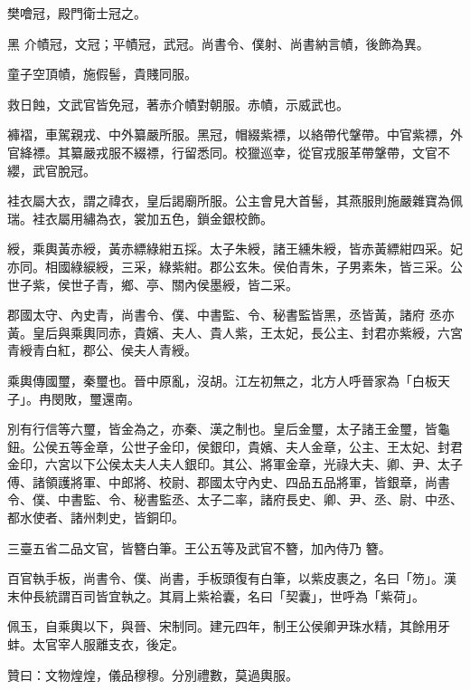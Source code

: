\begin{pinyinscope}
 樊噲冠，殿門衛士冠之。



 黑
 介幘冠，文冠；平幘冠，武冠。尚書令、僕射、尚書納言幘，後飾為異。



 童子空頂幘，施假髻，貴賤同服。



 救日蝕，文武官皆免冠，著赤介幘對朝服。赤幘，示威武也。



 褲褶，車駕親戎、中外纂嚴所服。黑冠，帽綴紫褾，以絡帶代鞶帶。中官紫褾，外官絳褾。其纂嚴戎服不綴褾，行留悉同。校獵巡幸，從官戎服革帶鞶帶，文官不纓，武官脫冠。



 袿衣屬大衣，謂之禕衣，皇后謁廟所服。公主會見大首髻，其燕服則施嚴雜寶為佩瑞。袿衣屬用繡為衣，裳加五色，鎖金銀校飾。



 綬，乘輿黃赤綬，黃赤縹綠紺五採。太子朱綬，諸王纁朱綬，皆赤黃縹紺四采。妃亦同。相國綠綟綬，三采，綠紫紺。郡公玄朱。侯伯青朱，子男素朱，皆三采。公世子紫，侯世子青，鄉、亭、關內侯墨綬，皆二采。



 郡國太守、內史青，尚書令、僕、中書監、令、秘書監皆黑，丞皆黃，諸府
 丞亦黃。皇后與乘輿同赤，貴嬪、夫人、貴人紫，王太妃，長公主、封君亦紫綬，六宮青綬青白紅，郡公、侯夫人青綬。



 乘輿傳國璽，秦璽也。晉中原亂，沒胡。江左初無之，北方人呼晉家為「白板天子」。冉閔敗，璽還南。



 別有行信等六璽，皆金為之，亦秦、漢之制也。皇后金璽，太子諸王金璽，皆龜鈕。公侯五等金章，公世子金印，侯銀印，貴嬪、夫人金章，公主、王太妃、封君金印，六宮以下公侯太夫人夫人銀印。其公、將軍金章，光祿大夫、卿、尹、太子傅、諸領護將軍、中郎將、校尉、郡國太守內史、四品五品將軍，皆銀章，尚書令、僕、中書監、令、秘書監丞、太子二率，諸府長史、卿、尹、丞、尉、中丞、都水使者、諸州刺史，皆銅印。



 三臺五省二品文官，皆簪白筆。王公五等及武官不簪，加內侍乃
 簪。



 百官執手板，尚書令、僕、尚書，手板頭復有白筆，以紫皮裹之，名曰「笏」。漢末仲長統謂百司皆宜執之。其肩上紫袷囊，名曰「契囊」，世呼為「紫荷」。



 佩玉，自乘輿以下，與晉、宋制同。建元四年，制王公侯卿尹珠水精，其餘用牙蚌。太官宰人服離支衣，後定。



 贊曰：文物煌煌，儀品穆穆。分別禮數，莫過輿服。



\end{pinyinscope}